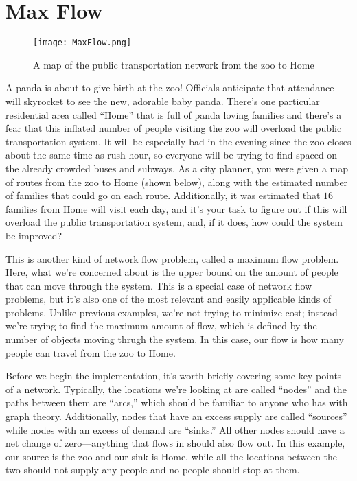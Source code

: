 \documentclass{article}
\begin{document}
\section*{Max Flow}

\begin{figure}
\begin{center}
 \texttt{[image: MaxFlow.png]}
\end{center}
\caption{A map of the public transportation network from the zoo to Home}
\end{figure} 

A panda is about to give birth at the zoo!  Officials anticipate that attendance will skyrocket to see the new, adorable baby panda.  There's one particular residential area called ``Home'' that is full of panda loving families and there's a fear that this inflated number of people visiting the zoo will overload the public transportation system.  It will be especially bad in the evening since the zoo closes about the same time as rush hour, so everyone will be trying to find spaced on the already crowded buses and subways.  As a city planner, you were given a map of routes from the zoo to Home (shown below), along with the estimated number of families that could go on each route.  Additionally, it was estimated that $16$ families from Home will visit each day, and it's your task to figure out if this will overload the public transportation system, and, if it does, how could the system be improved?

This is another kind of network flow problem, called a maximum flow problem.  Here, what we're concerned about is the upper bound on the amount of people that can move through the system.  This is a special case of network flow problems, but it's also one of the most relevant and easily applicable kinds of problems.  Unlike previous examples, we're not trying to minimize cost; instead we're trying to find the maximum amount of flow, which is defined by the number of objects moving thrugh the system.  In this case, our flow is how many people can travel from the zoo to Home.

Before we begin the implementation, it's worth briefly covering some key points of a network.  Typically, the locations we're looking at are called ``nodes'' and the paths between them are ``arcs,'' which should be familiar to anyone who has with graph theory.  Additionally, nodes that have an excess supply are called ``sources'' while nodes with an excess of demand are ``sinks.''  All other nodes should have a net change of zero---anything that flows in should also flow out.  In this example, our source is the zoo and our sink is Home, while all the locations between the two should not supply any people and no people should stop at them.
\end{document}
